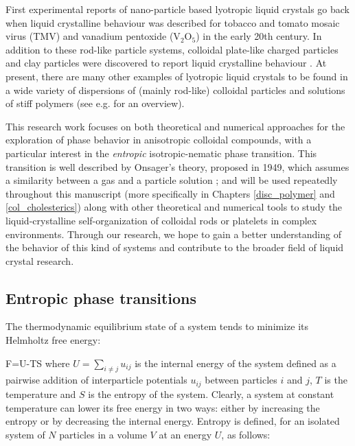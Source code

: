 First experimental reports of nano-particle based lyotropic liquid crystals go back when liquid crystalline behaviour was described for tobacco and tomato mosaic virus (TMV) \cite{Bawden,Bernal} and vanadium pentoxide (V$_{2}$O$_{5}$) \cite{Zocher} in the early 20th century. In addition to these rod-like particle systems, colloidal plate-like charged particles and clay particles were discovered to report liquid crystalline behaviour \cite{Langmuir}. At present, there are many other examples of lyotropic liquid crystals to be found in a wide variety of dispersions of (mainly rod-like) colloidal particles and solutions of stiff polymers (see e.g. \cite{Dierking2020} for an overview).

This research work focuses on both theoretical and numerical approaches for the exploration of phase behavior in anisotropic colloidal compounds, with a particular interest in the {\em entropic} isotropic-nematic phase transition. This transition is well described by Onsager's theory, proposed in 1949, which assumes a similarity between a gas and a particle solution \cite{onsager1949}; and will be used repeatedly throughout this manuscript (more specifically in Chapters \ref{disc_polymer} and \ref{col_cholesterics}) along with other theoretical and numerical tools to study the liquid-crystalline self-organization of colloidal rods or platelets in complex environments. Through our research, we hope to gain a better understanding of the behavior of this kind of systems and contribute to the broader field of liquid crystal research.

\subsection{Entropic phase transitions}

The thermodynamic equilibrium state of a system tends to minimize its Helmholtz free energy:

\beq
F=U-TS
\label{genhelmholtz}
\eeq
where $U = \sum_{i \neq j} u_{ij}$ is the internal energy of the system defined as a pairwise addition of interparticle potentials $u_{ij}$ between particles $i$ and $j$, $T$ is the temperature and $S$ is the entropy of the system. Clearly, a system at constant temperature can lower its free energy in two ways: either by increasing the entropy or by decreasing the internal energy. Entropy is defined, for an isolated system of $N$ particles in a volume $V$ at an energy $U$, as follows:

